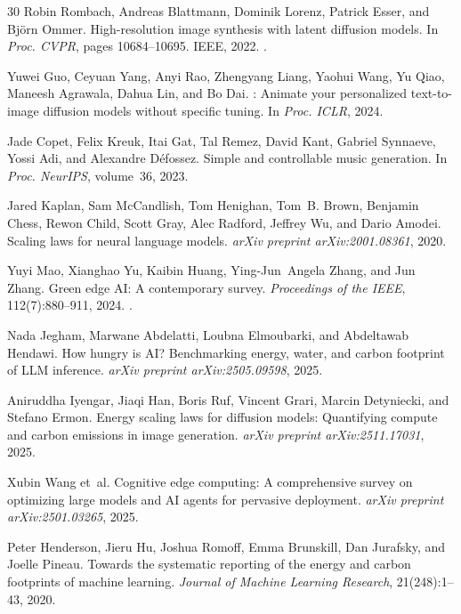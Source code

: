 \documentclass[acmlarge,manuscript,screen,review]{acmart}
\begin{document}
\begin{thebibliography}{30}
Robin Rombach, Andreas Blattmann, Dominik Lorenz, Patrick Esser, and Bj{\"o}rn Ommer.
\newblock High-resolution image synthesis with latent diffusion models.
\newblock In \emph{Proc. CVPR}, pages 10684--10695. IEEE, 2022.
\newblock {}.

Yuwei Guo, Ceyuan Yang, Anyi Rao, Zhengyang Liang, Yaohui Wang, Yu Qiao, Maneesh Agrawala, Dahua Lin, and Bo Dai.
: Animate your personalized text-to-image diffusion models without specific tuning.
\newblock In \emph{Proc. ICLR}, 2024.

Jade Copet, Felix Kreuk, Itai Gat, Tal Remez, David Kant, Gabriel Synnaeve, Yossi Adi, and Alexandre D{\'e}fossez.
\newblock Simple and controllable music generation.
\newblock In \emph{Proc. NeurIPS}, volume~36, 2023.

Jared Kaplan, Sam McCandlish, Tom Henighan, Tom~B. Brown, Benjamin Chess, Rewon Child, Scott Gray, Alec Radford, Jeffrey Wu, and Dario Amodei.
\newblock Scaling laws for neural language models.
\newblock \emph{arXiv preprint arXiv:2001.08361}, 2020.

Yuyi Mao, Xianghao Yu, Kaibin Huang, Ying-Jun~Angela Zhang, and Jun Zhang.
\newblock Green edge {AI}: A contemporary survey.
\newblock \emph{Proceedings of the IEEE}, 112(7):880--911, 2024.
\newblock {}.

Nada Jegham, Marwane Abdelatti, Loubna Elmoubarki, and Abdeltawab Hendawi.
\newblock How hungry is {AI}? {Benchmarking} energy, water, and carbon footprint of {LLM} inference.
\newblock \emph{arXiv preprint arXiv:2505.09598}, 2025.

Aniruddha Iyengar, Jiaqi Han, Boris Ruf, Vincent Grari, Marcin Detyniecki, and Stefano Ermon.
\newblock Energy scaling laws for diffusion models: Quantifying compute and carbon emissions in image generation.
\newblock \emph{arXiv preprint arXiv:2511.17031}, 2025.

Xubin Wang et~al.
\newblock Cognitive edge computing: A comprehensive survey on optimizing large models and {AI} agents for pervasive deployment.
\newblock \emph{arXiv preprint arXiv:2501.03265}, 2025.

Peter Henderson, Jieru Hu, Joshua Romoff, Emma Brunskill, Dan Jurafsky, and Joelle Pineau.
\newblock Towards the systematic reporting of the energy and carbon footprints of machine learning.
\newblock \emph{Journal of Machine Learning Research}, 21(248):1--43, 2020.


\end{thebibliography}
\end{document}
